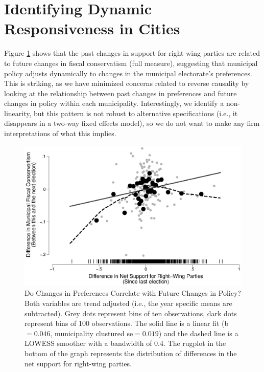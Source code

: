 \documentclass[a4paper,12pt]{article}
\begin{document}
\section*{Identifying Dynamic Responsiveness in Cities}


Figure \ref{fig:scatter} shows that the past changes in support for right-wing parties are related to future changes in fiscal conservatism (full measure), suggesting that municipal policy adjusts dynamically to changes in the municipal electorate's preferences. This is striking, as we have minimized concerns related to reverse causality by looking at the relationship between past changes in preferences and future changes in policy within each municipality. Interestingly, we identify a non-linearity, but this pattern is not robust to alternative specifications (i.e., it disappears in a two-way fixed effects model), so we do not want to make any firm interpretations of what this implies.


\begin{figure}[h]
	\centering
	\includegraphics[scale = 0.8]{scatterplot.eps}
	\caption{Do Changes in Preferences Correlate with Future Changes in Policy? Both variables are trend adjusted (i.e., the year specific means are subtracted). Grey dots represent bins of ten observations, dark dots represent bins of 100  observations. The solid line is a linear fit (b$=0.046$, municipality clustured se$=0.019$) and the dashed line is a LOWESS smoother with a bandwidth of 0.4. The rugplot in the bottom of the graph represents the distribution of differences in the net support for right-wing parties. }
	\label{fig:scatter}
\end{figure}
\end{document}
